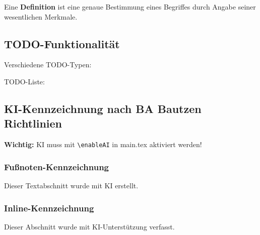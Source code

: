 \documentclass[../main.tex]{subfiles}
\begin{document}
\begin{definition}
Eine \textbf{Definition} ist eine genaue Bestimmung eines Begriffes durch Angabe seiner wesentlichen Merkmale.
\end{definition}


\subsection{TODO-Funktionalität}

Verschiedene TODO-Typen:

TODO-Liste:
\begin{todolist}
    \item {}
    \item {}
    \item {}
\end{todolist}



\subsection{KI-Kennzeichnung nach BA Bautzen Richtlinien}

\textbf{Wichtig:} KI muss mit \verb|\enableAI| in main.tex aktiviert werden!

\subsubsection{Fußnoten-Kennzeichnung}
Dieser Textabschnitt wurde mit KI erstellt.

\subsubsection{Inline-Kennzeichnung}
Dieser Abschnitt wurde mit KI-Unterstützung verfasst.
\end{document}
